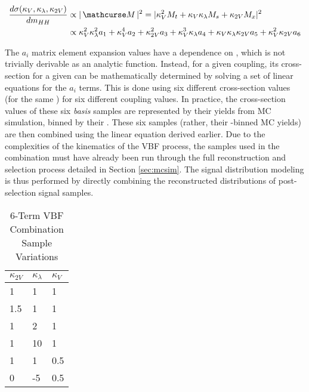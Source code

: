    \begin{equation} \begin{split} \label{eq:tree_level_invamp_simple}
        \dXsecM &\propto |\invAmp|^2 = |  \kv^2 M_t + \kv \kl M_s + \kvv M_x |^2 \\
        &\propto \kv^2 \kl^2 a_1 + \kv^4 a_2 + \kvv^2 a_3 + \kv^3 \kl a_4 + \kv \kl \kvv a_5 + \kv^2 \kvv a_6
    \end{split} \end{equation}

    The $a_i$ matrix element expansion values have a dependence on \mhh, which is not trivially derivable as an analytic function.
    Instead, for a given coupling, its cross-section for a given \mhh can be mathematically determined by solving a set of linear equations for the $a_i$ terms.
    This is done using six different cross-section values (for the same \mhh) for six different coupling values.
    In practice, the cross-section values of these six \textit{basis} samples are represented by their yields from MC simulation, binned by their \mhh.
    These six samples (rather, their \mhh-binned MC yields) are then combined using the linear equation derived earlier.
    Due to the complexities of the kinematics of the VBF process,
        the samples used in the combination must have already been run through the full reconstruction and selection process detailed in Section \ref{sec:mcsim}.
    The signal distribution modeling is thus performed by directly combining the reconstructed \mhh distributions of post-selection signal samples.

    \begin{table}[] \centering
    \caption{6-Term VBF Combination Sample Variations}
    \label{tab:vbf_hh_6term_varlist}
    \begin{tabular}{ |l|l|l| }
        \hline
        \textbf {$\kappa_{2V}$} & \textbf {$\kappa_\lambda$} & \textbf {$\kappa_V$} \\
        \hline
            1   &   1 & 1   \\
            1.5 &   1 & 1   \\
            1   &   2 & 1   \\
            1   &  10 & 1   \\
            1   &   1 & 0.5 \\
            0   &  -5 & 0.5 \\
        \hline
    \end{tabular} \end{table}


